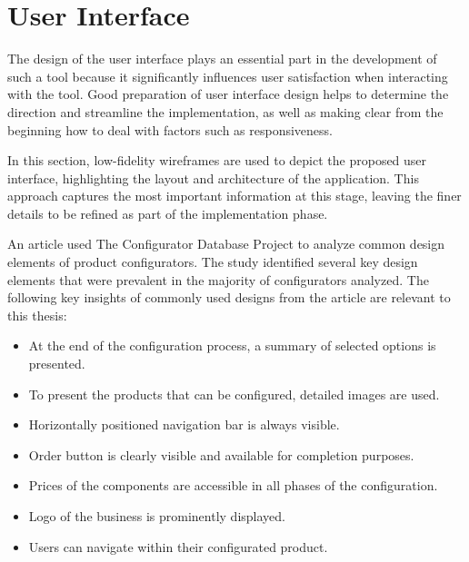 \section{User Interface} \label{section:wireframes}

The design of the user interface plays an essential part in the development of such a tool because it significantly influences user satisfaction when interacting with the tool. Good preparation of user interface design helps to determine the direction and streamline the implementation, as well as making clear from the beginning how to deal with factors such as responsiveness.

In this section, low-fidelity wireframes are used to depict the proposed user interface, highlighting the layout and architecture of the application. This approach captures the most important information at this stage, leaving the finer details to be refined as part of the implementation phase.

An article \cite{Leitner2014} used The Configurator Database Project to analyze common design elements of product configurators. The study identified several key design elements that were prevalent in the majority of configurators analyzed. The following key insights of commonly used designs from the article are relevant to this thesis:
\begin{itemize}[label=\rectanglebullet]
    \item At the end of the configuration process, a summary of selected options is presented.
    \item To present the products that can be configured, detailed images are used.
    \item Horizontally positioned navigation bar is always visible.
    \item Order button is clearly visible and available for completion purposes.
    \item Prices of the components are accessible in all phases of the configuration.
    \item Logo of the business is prominently displayed.
    \item Users can navigate within their configurated product.
\end{itemize}

